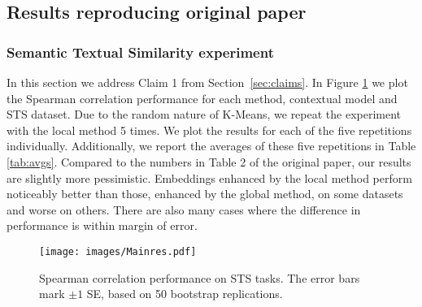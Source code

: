 \subsection{Results reproducing original paper}

\subsubsection{Semantic Textual Similarity experiment}

In this section we address Claim 1 from Section~\ref{sec:claims}. In Figure \ref{fig:main} we plot the Spearman correlation performance for each method, contextual model and STS dataset. Due to the random nature of K-Means, we repeat the experiment with the local method 5 times. We plot the results for each of the five repetitions individually. Additionally, we report the averages of these five repetitions in Table \ref{tab:avgs}. Compared to the numbers in Table 2 of the original paper, our results are slightly more pessimistic. Embeddings enhanced by the local method perform noticeably better than those, enhanced by the global method, on some datasets and worse on others. There are also many cases where the difference in performance is within margin of error. 

\begin{figure}[h]
   \centering
   \texttt{[image: images/Mainres.pdf]}
    \caption{Spearman correlation performance on STS tasks. The error bars mark $\pm1$ SE, based on 50 bootstrap replications.}
    \label{fig:main}
\end{figure}

